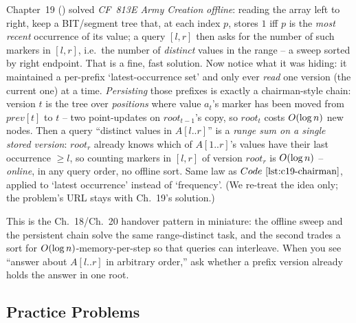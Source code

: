 \begin{insightbox}
Chapter~19 () solved \emph{CF~813E Army Creation} \emph{offline}: reading the array left to right, keep a BIT/segment tree that, at each index \(p\), stores \(1\) iff \(p\) is the \emph{most recent} occurrence of its value; a query \([l,r]\) then asks for the number of such markers in \([l,r]\), i.e.\ the number of \emph{distinct} values in the range -- a sweep sorted by right endpoint. That is a fine, fast solution. Now notice what it was hiding: it maintained a per-prefix `latest-occurrence set' and only ever \emph{read} one version (the current one) at a time. \emph{Persisting} those prefixes is exactly a chairman-style chain: version \(t\) is the tree over \emph{positions} where value \(a_t\)'s marker has been moved from \(\mathit{prev}[t]\) to \(t\) -- two point-updates on \(\mathit{root}_{t-1}\)'s copy, so \(\mathit{root}_t\) costs \(O(\log n)\) new nodes. Then a query ``distinct values in \(A[l..r]\)'' is a \emph{range sum on a single stored version}: \(\mathit{root}_r\) already knows which of \(A[1..r]\)'s values have their last occurrence \(\ge l\), so counting markers in \([l,r]\) of version \(\mathit{root}_r\) is \(O(\log n)\) -- \emph{online}, in any query order, no offline sort. Same law as \(\coderef{c19-chairman}\), applied to `latest occurrence' instead of `frequency'. (We re-treat the idea only; the problem's URL stays with Ch.~19's solution.)
\end{insightbox}

This is the Ch.~18/Ch.~20 handover pattern in miniature: the offline sweep and the persistent chain solve the same range-distinct task, and the second trades a sort for \(O(\log n)\)-memory-per-step so that queries can interleave. When you see ``answer about \(A[l..r]\) in arbitrary order,'' ask whether a prefix version already holds the answer in one root.

\subsection{Practice Problems}

